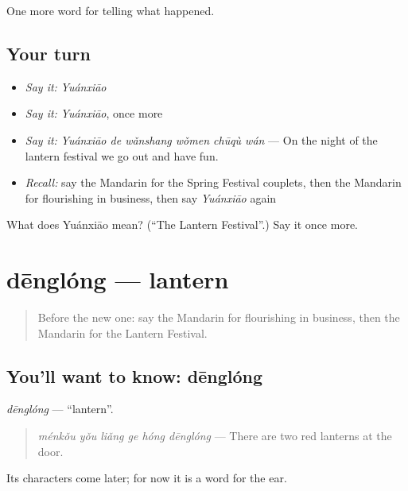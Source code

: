 \begin{grammarlens}[title={What you've built}]
One more word for telling what happened.
\end{grammarlens}

\subsection*{Your turn}
\begin{itemize}
\raggedright
  \item \emph{Say it:} \emph{Yuánxiāo}
  \item \emph{Say it:} \emph{Yuánxiāo}, once more
  \item \emph{Say it:} \emph{Yuánxiāo de wǎnshang wǒmen chūqù wán} — On the night of the lantern festival we go out and have fun.
  \item \emph{Recall:} say the Mandarin for the Spring Festival couplets, then the Mandarin for flourishing in business, then say \emph{Yuánxiāo} again
\end{itemize}

\begin{tcolorbox}[breakable,colback=teal!4,colframe=teal!35!black,title={Before you move on}]
What does Yuánxiāo mean? (\textquotedblleft{}The Lantern Festival\textquotedblright{}.) Say it once more.
\end{tcolorbox}
\section[dēnglóng]{dēnglóng — lantern}

\label{lesson:ZH-C335-denglong}



\begin{quote}
Before the new one: say the Mandarin for flourishing in business, then the Mandarin for the Lantern Festival.
\end{quote}

\subsection*{You'll want to know: dēnglóng}
\emph{dēnglóng} — \textquotedblleft{}lantern\textquotedblright{}.

\begin{quote}
\emph{ménkǒu yǒu liǎng ge hóng dēnglóng} — There are two red lanterns at the door.
\end{quote}

Its characters come later; for now it is a word for the ear.

